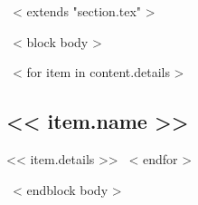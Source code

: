 ~< extends "section.tex" >~

~< block body >~


\setlength\fboxsep{2pt}





~< for item in content.details >~
	\subsection{<< item.name >>}
	<< item.details >>
~< endfor >~


~< endblock body >~
